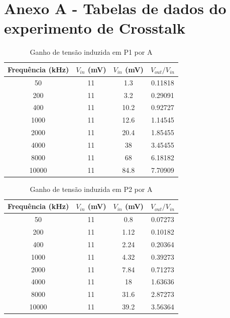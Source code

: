 \documentclass[12pt]{article}
\begin{document}
\section*{Anexo A - Tabelas de dados do experimento de Crosstalk}



\begin{table}[h]
  \centering
  \begin{tabular}{c|c|c|c}
    \toprule
    \textbf{Frequência (kHz)} & \textbf{$V_{in}$ (mV)} &
    \textbf{$V_{in}$ (mV)} & \textbf{${V_{out}}/{V_{in}}$} \\
    \midrule
    50	&11	&1.3	&0.11818 \\
    200	&11	&3.2	&0.29091 \\
    400	&11	&10.2	&0.92727 \\
    1000	&11	&12.6	&1.14545 \\
    2000	&11	&20.4	&1.85455 \\
    4000	&11	&38	&3.45455 \\
    8000	&11	&68	&6.18182 \\
    10000	&11	&84.8	&7.70909 \\
    \bottomrule
  \end{tabular}
  \caption{Ganho de tensão induzida em P1 por A}
  \label{tab:ganho-tensao-p1}
\end{table}

\begin{table}[h]
  \centering
  \begin{tabular}{c|c|c|c}
    \toprule
    \textbf{Frequência (kHz)} & \textbf{$V_{in}$ (mV)} &
    \textbf{$V_{in}$ (mV)} & \textbf{${V_{out}}/{V_{in}}$} \\
    \midrule
    50	&11	&0.8	&0.07273 \\
    200	&11	&1.12	&0.10182 \\
    400	&11	&2.24	&0.20364 \\
    1000	&11	&4.32	&0.39273 \\
    2000	&11	&7.84	&0.71273 \\
    4000	&11	&18	&1.63636 \\
    8000	&11	&31.6	&2.87273 \\
    10000	&11	&39.2	&3.56364 \\
    \bottomrule
  \end{tabular}
  \caption{Ganho de tensão induzida em P2 por A}
  \label{tab:ganho-tensao-p2}
\end{table}
\end{document}

